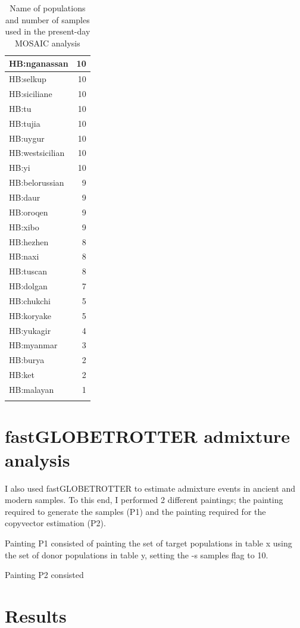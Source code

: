 \begin{table}
\begin{tabular}{l|r}
HB:nganassan & 10\\
\hline
HB:selkup & 10\\
\hline
HB:siciliane & 10\\
\hline
HB:tu & 10\\
\hline
HB:tujia & 10\\
\hline
HB:uygur & 10\\
\hline
HB:westsicilian & 10\\
\hline
HB:yi & 10\\
\hline
HB:belorussian & 9\\
\hline
HB:daur & 9\\
\hline
HB:oroqen & 9\\
\hline
HB:xibo & 9\\
\hline
HB:hezhen & 8\\
\hline
HB:naxi & 8\\
\hline
HB:tuscan & 8\\
\hline
HB:dolgan & 7\\
\hline
HB:chukchi & 5\\
\hline
HB:koryake & 5\\
\hline
HB:yukagir & 4\\
\hline
HB:myanmar & 3\\
\hline
HB:burya & 2\\
\hline
HB:ket & 2\\
\hline
HB:malayan & 1\\
\hline
\label{table:present-day_inds_MOSAIC}
\end{tabular}
\caption{Name of populations and number of samples used in the present-day MOSAIC analysis}
\end{table}

\section{fastGLOBETROTTER admixture analysis}

I also used fastGLOBETROTTER to estimate admixture events in ancient and modern samples. To this end, I performed 2 different paintings; the painting required to generate the samples (P1) and the painting required for the copyvector estimation (P2).

Painting P1 consisted of painting the set of target populations in table x using the set of donor populations in table y, setting the -s samples flag to 10.  

Painting P2 consisted

\section{Results}

